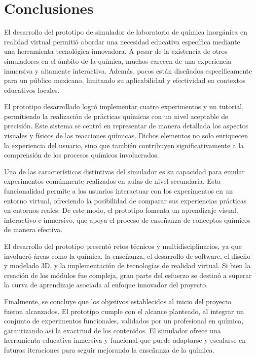 \chapter{Conclusiones}\label{ch:Conclusiones}
El desarrollo del prototipo de simulador de laboratorio de química inorgánica en realidad virtual permitió abordar una necesidad educativa específica mediante una herramienta tecnológica innovadora. A pesar de la existencia de otros simuladores en el ámbito de la química, muchos carecen de una experiencia inmersiva y altamente interactiva. Además, pocos están diseñados específicamente para un público mexicano, limitando su aplicabilidad y efectividad en contextos educativos locales.

El prototipo desarrollado logró implementar cuatro experimentos y un tutorial, permitiendo la realización de prácticas químicas con un nivel aceptable de precisión. Este sistema se centró en representar de manera detallada los aspectos visuales y físicos de las reacciones químicas.
Dichos elementos no solo enriquecen la experiencia del usuario, sino que también contribuyen significativamente a la comprensión de los procesos químicos involucrados.

Una de las características distintivas del simulador es su capacidad para emular experimentos comúnmente realizados en aulas de nivel secundaria. Esta funcionalidad permite a los usuarios interactuar con los experimentos en un entorno virtual, ofreciendo la posibilidad de comparar sus experiencias prácticas en entornos reales. De este modo, el prototipo fomenta un aprendizaje visual, interactivo e inmersivo, que apoya el proceso de enseñanza de conceptos químicos de manera efectiva.

El desarrollo del prototipo presentó retos técnicos y multidisciplinarios, ya que involucró áreas como la química, la enseñanza, el desarrollo de software, el diseño y modelado 3D, y la implementación de tecnologías de realidad virtual. Si bien la creación de los módulos fue compleja, gran parte del esfuerzo se destinó a superar la curva de aprendizaje asociada al enfoque innovador del proyecto.

Finalmente, se concluye que los objetivos establecidos al inicio del proyecto fueron alcanzados. El prototipo cumple con el alcance planteado, al integrar un conjunto de experimentos funcionales, validados por un profesional en química, garantizando así la exactitud de los contenidos. El simulador ofrece una herramienta educativa inmersiva y funcional que puede adaptarse y escalarse en futuras iteraciones para seguir mejorando la enseñanza de la química.
